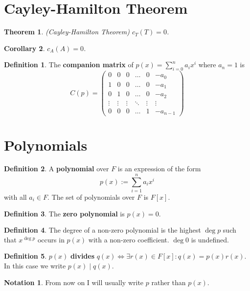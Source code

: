 \documentclass[12pt]{article}
\newtheorem{thm}{Theorem}[section]
\newtheorem{cor}[thm]{Corollary}
\theoremstyle{definition}
\newtheorem*{defn*}{Definition}
\newtheorem*{not*}{Notation}
\begin{document}
\section{Cayley-Hamilton Theorem}

\begin{thm}
	(Cayley-Hamilton Theorem)
	$c_T(T) = 0$.
\end{thm}

\begin{cor}
	$c_A(A) = 0$.
\end{cor}

\begin{defn*}
	The \textbf{companion matrix} of $p(x) = \sum_{i = 0}^na_ix^i$ where $a_n = 1$ is
	$$C(p) = \begin{pmatrix}
		0 & 0 & 0 & \ldots & 0 & -a_0 \\
		1 & 0 & 0 & \ldots & 0 & -a_1 \\
		0 & 1 & 0 & \ldots & 0 & -a_2 \\
		\vdots & \vdots & \vdots & \ddots & \vdots & \vdots \\
		0 & 0 & 0 & \ldots & 1 & -a_{n - 1}
	\end{pmatrix}$$
\end{defn*}

\section{Polynomials}

\begin{defn*}
	A \textbf{polynomial} over $F$ is an expression of the form
	$$p(x) := \sum_{i = 1}^na_ix^i$$
	with all $a_i \in F$.
	The set of polynomials over $F$ is $F[x]$.
\end{defn*}

\begin{defn*}
	The \textbf{zero polynomial} is $p(x) = 0$.
\end{defn*}

\begin{defn*}
	The degree of a non-zero polynomial is the highest $\deg{p}$ such that $x^{\deg{p}}$ occurs in $p(x)$ with a non-zero coefficient.
	$\deg{0}$ is undefined.
\end{defn*}

\begin{defn*}
	$p(x)$ \textbf{divides} $q(x) \iff \exists r(x) \in F[x] : q(x) = p(x)r(x)$.
	In this case we write $p(x) \mid q(x)$.
\end{defn*}

\begin{not*}
	From now on I will usually write $p$ rather than $p(x)$.
\end{not*}
\end{document}
